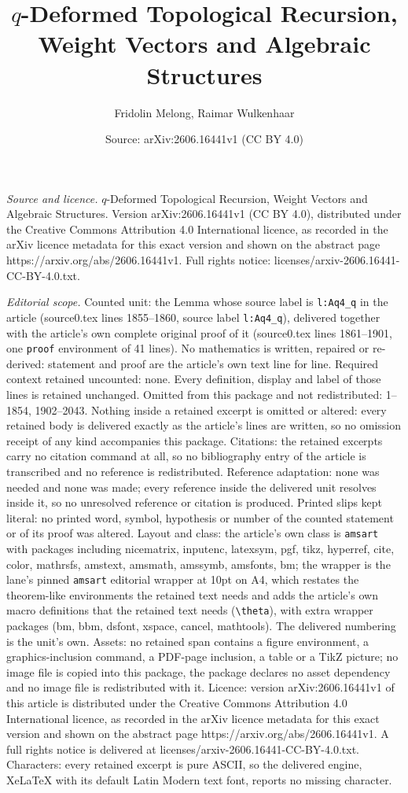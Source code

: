 \documentclass[10pt,a4paper]{amsart}
\title[$q$-Deformed Topological Recursion, Weight Vectors and Algeb]{$q$-Deformed Topological Recursion, Weight Vectors and Algebraic Structures}
\author{Fridolin Melong, Raimar Wulkenhaar}
\date{Source: arXiv:2606.16441v1 (CC BY 4.0)}
\begin{document}
\maketitle

\noindent\emph{Source and licence.} $q$-Deformed Topological Recursion, Weight Vectors and Algebraic Structures. Version arXiv:2606.16441v1 (CC BY 4.0), distributed under the Creative Commons Attribution 4.0 International licence, as recorded in the arXiv licence metadata for this exact version and shown on the abstract page https://arxiv.org/abs/2606.16441v1. Full rights notice: licenses/arxiv-2606.16441-CC-BY-4.0.txt.\par\smallskip

\noindent\textit{Editorial scope.} Counted unit: the Lemma whose source label is \texttt{l:Aq4\_q} in the article (source0.tex lines 1855--1860, source label \texttt{l:Aq4\_q}), delivered together with the article's own complete original proof of it (source0.tex lines 1861--1901, one \texttt{proof} environment of 41 lines). No mathematics is written, repaired or re-derived: statement and proof are the article's own text line for line. Required context retained uncounted: none. Every definition, display and label of those lines is retained unchanged. Omitted from this package and not redistributed: 1--1854, 1902--2043. Nothing inside a retained excerpt is omitted or altered: every retained body is delivered exactly as the article's lines are written, so no omission receipt of any kind accompanies this package. Citations: the retained excerpts carry no citation command at all, so no bibliography entry of the article is transcribed and no reference is redistributed. Reference adaptation: none was needed and none was made; every reference inside the delivered unit resolves inside it, so no unresolved reference or citation is produced. Printed slips kept literal: no printed word, symbol, hypothesis or number of the counted statement or of its proof was altered. Layout and class: the article's own class is \texttt{amsart} with packages including nicematrix, inputenc, latexsym, pgf, tikz, hyperref, cite, color, mathrsfs, amstext, amsmath, amssymb, amsfonts, bm; the wrapper is the lane's pinned \texttt{amsart} editorial wrapper at 10pt on A4, which restates the theorem-like environments the retained text needs and adds the article's own macro definitions that the retained text needs (\texttt{\textbackslash theta}), with extra wrapper packages (bm, bbm, dsfont, xspace, cancel, mathtools). The delivered numbering is the unit's own. Assets: no retained span contains a figure environment, a graphics-inclusion command, a PDF-page inclusion, a table or a TikZ picture; no image file is copied into this package, the package declares no asset dependency and no image file is redistributed with it. Licence: version arXiv:2606.16441v1 of this article is distributed under the Creative Commons Attribution 4.0 International licence, as recorded in the arXiv licence metadata for this exact version and shown on the abstract page https://arxiv.org/abs/2606.16441v1. A full rights notice is delivered at licenses/arxiv-2606.16441-CC-BY-4.0.txt. Characters: every retained excerpt is pure ASCII, so the delivered engine, XeLaTeX with its default Latin Modern text font, reports no missing character.
\end{document}
